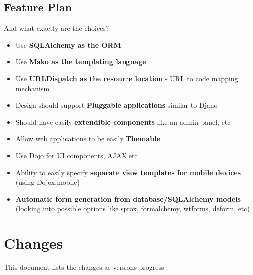 \documentclass[letterpaper,10pt,english]{sphinxmanual}
\begin{document}
\section{Feature Plan}
\label{README:feature-plan}
And what exactly are the choices?
\begin{itemize}
\item {} 
Use \textbf{SQLAlchemy as the ORM}

\item {} 
Use \textbf{Mako as the templating language}

\item {} 
Use \textbf{URLDispatch as the resource location} - URL to code mapping mechanism

\item {} 
Design should support \textbf{Pluggable applications} similar to Djano

\item {} 
Should have easily \textbf{extendible components} like an admin panel, etc

\item {} 
Allow web applications to be easily \textbf{Themable}

\item {} 
Use \href{http://dojotoolkit.org/}{Dojo} for UI components, AJAX etc

\item {} 
Ability to easily specify \textbf{separate view templates for mobile devices} (using Dojox.mobile)

\item {} 
\textbf{Automatic form generation from database/SQLAlchemy models} (looking into possible options like sprox, formalchemy, wtforms, deform, etc)

\end{itemize}


\chapter{Changes}
\label{changes:changes}\label{changes::doc}\label{changes:id1}
This document lists the changes as versions progress
\end{document}
